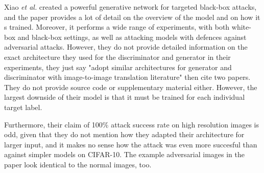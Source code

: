 Xiao \textit{et al.} created a powerful generative network for targeted black-box attacks, and the paper provides a lot of detail on the overview of the model and on how it s trained. Moreover, it performs a wide range of experiments, with both white-box and black-box settings, as well as attacking models with defences against adversarial attacks. However, they do not provide detailed information on the exact architecture they used for the discriminator and generator in their experiments, they just say "adopt similar architectures for generator and discriminator with image-to-image translation literature" then cite two papers. They do not provide source code or supplementary material either. However, the largest downside of their model is that it must be trained for each individual target label.

Furthermore, their claim of 100\% attack success rate on high resolution images is odd, given that they do not mention how they adapted their architecture for larger input, and it makes no sense how the attack was even more succesful than against simpler models on CIFAR-10. The example adversarial images in the paper look identical to the normal images, too.
